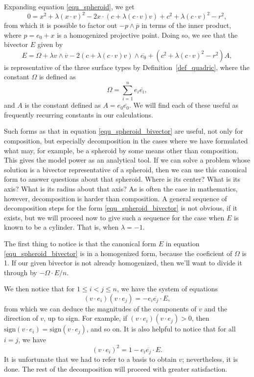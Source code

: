 \documentclass{ecgd-l}
\theoremstyle{definition}
\theoremstyle{remark}
\numberwithin{equation}{section}
\begin{document}
Expanding equation \eqref{equ_spheroid}, we get
\begin{equation}
0 = x^2 + \lambda(x\cdot v)^2 - 2x\cdot (c+\lambda(c\cdot v)v) + c^2 + \lambda(c\cdot v)^2 - r^2,
\end{equation}
from which it is possible to factor out $-p\wedge\overline{p}$
in terms of the inner product, where $p=e_0+x$
is a homogenized projective point.  Doing so, we see that the bivector
$E$ given by
\begin{equation}\label{equ_spheroid_bivector}
E = \Omega + \lambda v\wedge\overline{v} - 2(c+\lambda(c\cdot v)v)\wedge\overline{e_0} + (c^2+\lambda(c\cdot v)^2-r^2)A,
\end{equation}
is representative of the three surface types by Definition~\ref{def_quadric}, where the constant
$\Omega$ is defined as
\begin{equation}
\Omega=\sum_{i=1}^n e_i\overline{e_i},
\end{equation}
and $A$ is the constant defined as $A=e_0\overline{e_0}$.  We will find each of these useful as
frequently recurring constants in our calculations.

Such forms as that in equation \eqref{equ_spheroid_bivector} are useful, not only
for composition, but especially decomposition in the cases
where we have formulated what may, for example, be a spheroid by some means
other than composition.
This gives the model power as an analytical tool.  If we can solve a problem whose solution
is a bivector representative of a spheroid, then we can use this canonical form to answer
questions about that spheroid.  Where is its center?  What is its axis?  What is its radius
about that axis?  As is often the case in mathematics, however, decomposition is
harder than composition.  A general sequence of decomposition steps for the
form \eqref{equ_spheroid_bivector} is not obvious, if it exists, but we will
proceed now to give such a sequence for the case when $E$ is known
to be a cylinder.  That is, when $\lambda=-1$.

The first thing to notice is that the canonical form $E$ in equation \eqref{equ_spheroid_bivector}
is in a homogenized form, because the coeficient of $\Omega$ is 1.  If our given bivector
is not already homogenized, then we'll want to divide it through by $-\Omega\cdot E/n$.

We then notice that for $1\leq i<j\leq n$, we have the system of equations
\begin{equation}
(v\cdot e_i)(v\cdot e_j) = -e_i\overline{e_j}\cdot E,
\end{equation}
from which we can deduce the magnitudes of the components of $v$ and the
direction of $v$, up to sign.  For example, if $(v\cdot e_i)(v\cdot e_j)>0$,
then $\mbox{sign}(v\cdot e_i)=\mbox{sign}(v\cdot e_j)$, and so on.
It is also helpful to notice that for all $i=j$, we have
\begin{equation}
(v\cdot e_i)^2 = 1 - e_i\overline{e_j}\cdot E.
\end{equation}
It is unfortunate that we had to refer to a basis to obtain $v$; nevertheless,
it is done.  The rest of the decomposition will proceed with greater satisfaction.
\end{document}
